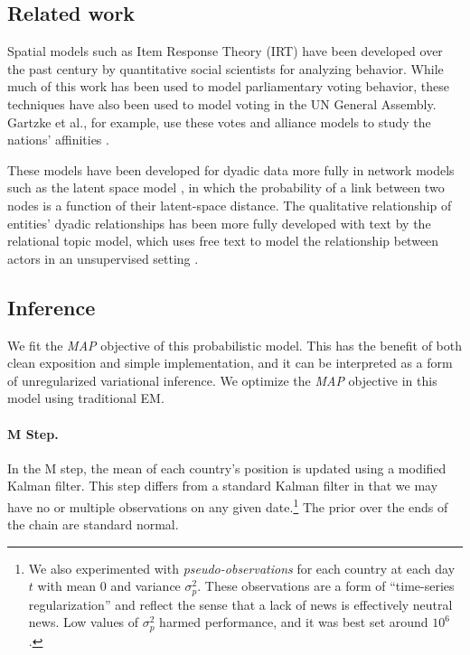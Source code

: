 \subsection{Related work}

Spatial models such as Item Response Theory (IRT) have been developed
over the past century by quantitative social scientists for analyzing
behavior.  While much of this work has been used to model
parliamentary voting behavior, these techniques have also been used to
model voting in the UN General Assembly. Gartzke et al., for example,
use these votes and alliance models to study the nations' affinities
\cite{gartzke:1998}.

These models have been developed for dyadic data more fully in network
models such as the latent space model \cite{hoff:2002,sarkar:2005}, in
which the probability of a link between two nodes is a function of
their latent-space distance.  The qualitative relationship of
entities' dyadic relationships has been more fully developed with text
by the relational topic model, which uses free text to model the
relationship between actors in an unsupervised setting
\cite{chang:2009}.



\subsection{Inference}
We fit the \emph{MAP} objective of this probabilistic model.  This has
the benefit of both clean exposition and simple implementation, and it
can be interpreted as a form of unregularized variational inference.
We optimize the \emph{MAP} objective in this model using traditional
EM.

\paragraph{M Step.} In the M step, the mean of each country's position
is updated using a modified Kalman filter.  This step differs from a
standard Kalman filter in that we may have no or multiple observations
on any given date.\footnote{We also experimented with
  \emph{pseudo-observations} for each country at each day $t$ with
  mean 0 and variance $\sigma_p^2$.  These observations are a form of
  ``time-series regularization'' and reflect the sense that a lack of
  news is effectively neutral news.  Low values of $\sigma_p^2$ harmed
  performance, and it was best set around $10^6$.}  The prior over the
ends of the chain are standard normal.

